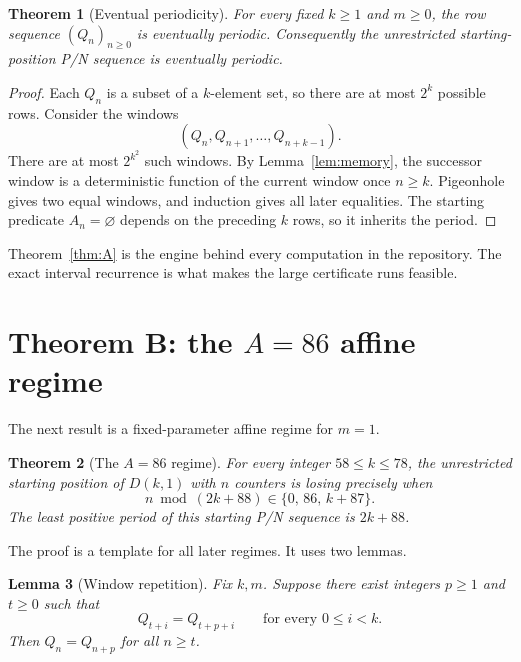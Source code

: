 \documentclass[11pt]{article}
\newtheorem{theorem}{Theorem}[section]
\newtheorem{lemma}[theorem]{Lemma}
\theoremstyle{remark}
\begin{document}
\begin{theorem}[Eventual periodicity]\label{thm:period}
For every fixed \(k\ge1\) and \(m\ge0\), the row sequence \((Q_n)_{n\ge0}\) is eventually periodic. Consequently the unrestricted starting-position P/N sequence is eventually periodic.
\end{theorem}

\begin{proof}
Each \(Q_n\) is a subset of a \(k\)-element set, so there are at most \(2^k\) possible rows. Consider the windows
\[
(Q_n,Q_{n+1},\dots,Q_{n+k-1}).
\]
There are at most \(2^{k^2}\) such windows. By Lemma~\ref{lem:memory}, the successor window is a deterministic function of the current window once \(n\ge k\). Pigeonhole gives two equal windows, and induction gives all later equalities. The starting predicate \(A_n=\varnothing\) depends on the preceding \(k\) rows, so it inherits the period.
\end{proof}

Theorem~\ref{thm:A} is the engine behind every computation in the repository. The exact interval recurrence is what makes the large certificate runs feasible.

\section{Theorem B: the \(A=86\) affine regime}\label{sec:B}

The next result is a fixed-parameter affine regime for \(m=1\).

\begin{theorem}[The \(A=86\) regime]\label{thm:B}
For every integer \(58\le k\le78\), the unrestricted starting position of \(D(k,1)\) with \(n\) counters is losing precisely when
\begin{equation}\label{eq:B}
\boxed{
n\bmod(2k+88)\in\{0,\,86,\,k+87\}.
}
\end{equation}
The least positive period of this starting P/N sequence is \(2k+88\).
\end{theorem}

The proof is a template for all later regimes. It uses two lemmas.

\begin{lemma}[Window repetition]\label{lem:window}
Fix \(k,m\). Suppose there exist integers \(p\ge1\) and \(t\ge0\) such that
\[
Q_{t+i}=Q_{t+p+i}
\qquad\text{for every }0\le i<k.
\]
Then \(Q_n=Q_{n+p}\) for all \(n\ge t\).
\end{lemma}
\end{document}
